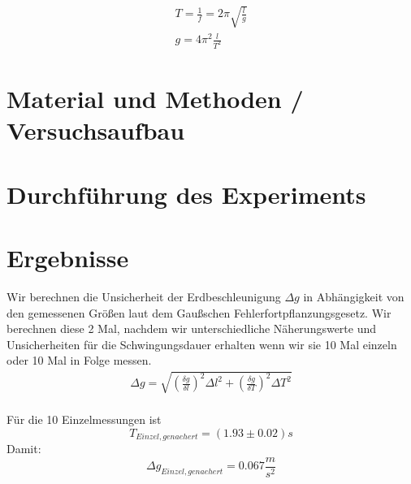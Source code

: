 \documentclass{article}
\begin{document}
\begin{align}
T=\frac{1}{f}=2 \pi\sqrt{\frac{l}{g}} \\
g=4\pi^2\frac{l}{T^2}
\end{align}
\section{Material und Methoden / Versuchsaufbau}

\section{Durchführung des Experiments}

\section{Ergebnisse}
Wir berechnen die Unsicherheit der Erdbeschleunigung $\Delta g$ in Abhängigkeit von den gemessenen Größen laut dem Gaußschen Fehlerfortpflanzungsgesetz. Wir berechnen diese 2 Mal, nachdem wir unterschiedliche Näherungswerte und Unsicherheiten für die Schwingungsdauer erhalten wenn wir sie 10 Mal einzeln oder 10 Mal in Folge messen.
\begin{align}
\Delta g=\sqrt{(\frac{\delta g}{\delta l})^2\Delta l^2 + (\frac{\delta g}{\delta T})^2\Delta T^2}
\end{align} \\
Für die 10 Einzelmessungen ist
\begin{equation}
T_{Einzel,genaehert} = (1.93 \pm 0.02)s
\end{equation}
Damit:
\begin{equation}
\Delta g_{Einzel,genaehert} = 0.067 \frac{m}{s^2}
\end{equation}
\end{document}
